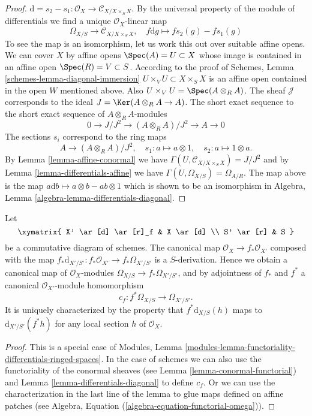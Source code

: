 \begin{proof}
$\text{d} = s_2 - s_1 : \mathcal{O}_X \to \mathcal{C}_{X/X \times_S X}$.
By the universal property of the module of differentials we find a
unique $\mathcal{O}_X$-linear map
$$
\Omega_{X/S} \longrightarrow \mathcal{C}_{X/X \times_S X},\quad
f\text{d}g \longmapsto fs_2(g) - fs_1(g)
$$
To see the map is an isomorphism, let us work this out over suitable affine
opens. We can cover $X$ by affine opens $\Spec(A) = U \subset X$
whose image is contained in an affine open $\Spec(R) = V \subset S$.
According to the proof of Schemes, Lemma \ref{schemes-lemma-diagonal-immersion}
$U \times_V U \subset X \times_S X$ is an affine open
contained in the open $W$ mentioned above. Also
$U \times_V U = \Spec(A \otimes_R A)$.
The sheaf $\mathcal{J}$ corresponds to the ideal
$J = \Ker(A \otimes_R A \to A)$.
The short exact sequence to the short exact sequence
of $A \otimes_R A$-modules
$$
0 \to J/J^2 \to (A \otimes_R A)/J^2 \to A \to 0
$$
The sections $s_i$ correspond to the ring maps
$$
A \longrightarrow (A \otimes_R A)/J^2,\quad
s_1 : a \mapsto a \otimes 1,\quad
s_2 : a \mapsto 1 \otimes a.
$$
By Lemma \ref{lemma-affine-conormal} we have
$\Gamma(U, \mathcal{C}_{X/X \times_S X}) = J/J^2$ and
by Lemma \ref{lemma-differentials-affine}
we have $\Gamma(U, \Omega_{X/S}) = \Omega_{A/R}$.
The map above is the map $a \text{d}b \mapsto a \otimes b - ab \otimes 1$
which is shown to be an isomorphism in
Algebra, Lemma \ref{algebra-lemma-differentials-diagonal}.
\end{proof}

\begin{lemma}
\label{lemma-functoriality-differentials}
Let
$$
\xymatrix{
X' \ar[d] \ar[r]_f & X \ar[d] \\
S' \ar[r] & S
}
$$
be a commutative diagram of schemes. The canonical map
$\mathcal{O}_X \to f_*\mathcal{O}_{X'}$ composed with the map
$f_*\text{d}_{X'/S'} : f_*\mathcal{O}_{X'} \to f_*\Omega_{X'/S'}$ is a
$S$-derivation. Hence we obtain a canonical map of $\mathcal{O}_X$-modules
$\Omega_{X/S} \to f_*\Omega_{X'/S'}$, and by
adjointness of $f_*$ and $f^*$ a
canonical $\mathcal{O}_{X'}$-module homomorphism
$$
c_f : f^*\Omega_{X/S} \longrightarrow \Omega_{X'/S'}.
$$
It is uniquely characterized by the property that
$f^*\text{d}_{X/S}(h)$ maps to $\text{d}_{X'/S'}(f^* h)$
for any local section $h$ of $\mathcal{O}_X$.
\end{lemma}

\begin{proof}
This is a special case of
Modules, Lemma \ref{modules-lemma-functoriality-differentials-ringed-spaces}.
In the case of schemes we can also use the functoriality of
the conormal sheaves (see Lemma \ref{lemma-conormal-functorial}) and
Lemma \ref{lemma-differentials-diagonal} to define $c_f$.
Or we can use the characterization in the last line of the lemma to
glue maps defined on affine patches
(see Algebra, Equation (\ref{algebra-equation-functorial-omega})).
\end{proof}

